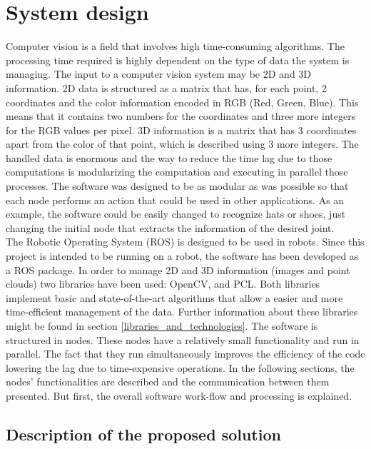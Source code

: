 \newpage
\section{System design}
\label{system_design}
Computer vision is a field that involves high time-consuming algorithms. 
The processing time required is highly dependent on the type of data the system is managing. 
The input to a computer vision system may be 2D and 3D information. 
2D data is structured as a matrix that has, for each point, 2 coordinates and the color information encoded in RGB (Red, Green, Blue).
This means that it contains two numbers for the coordinates and three more integers for the RGB values per pixel. 
3D information is a matrix that has 3 coordinates apart from the color of that point, which is described using 3 more integers. 
The handled data is enormous and the way to reduce the time lag due to those computations is modularizing the computation and executing in parallel those processes. 
The software was designed to be as modular as was possible so that each node performs an action that could be used in other applications. 
As an example, the software could be easily changed to recognize hats or shoes, just changing the initial node that extracts the information of the desired joint. 
\\

The Robotic Operating System (ROS) is designed to be used in robots. 
Since this project is intended to be running on a robot, the software has been developed as a ROS package. 
In order to manage 2D and 3D information (images and point clouds) two libraries have been used: OpenCV, and PCL. 
Both libraries implement basic and state-of-the-art algorithms that allow a easier and more time-efficient management of the data. Further information about these libraries might be found in section \ref{libraries_and_technologies}. 
The software is structured in nodes. 
These nodes have a relatively small functionality and run in parallel. 
The fact that they run simultaneously improves the efficiency of the code lowering the lag due to time-expensive operations. 
In the following sections, the nodes' functionalities are described and the communication between them presented. 
But first, the overall software work-flow and processing is explained. 


\subsection{Description of the proposed solution}


